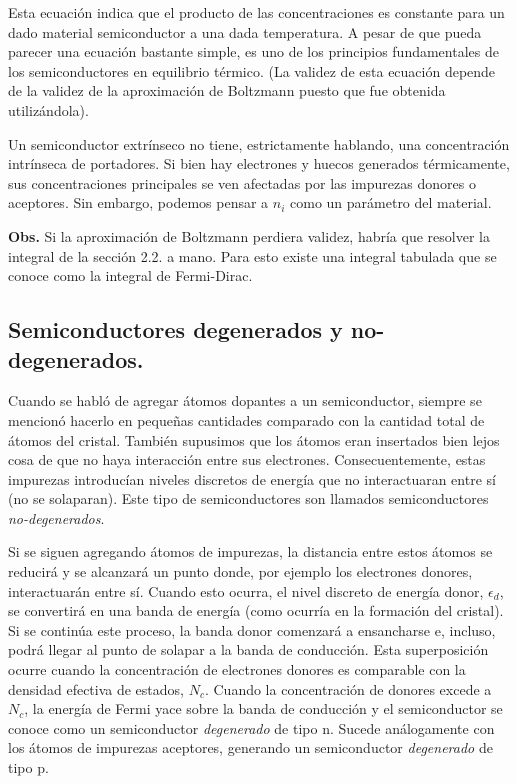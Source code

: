 \documentclass[12pt,a4paper]{article}
\begin{document}
Esta ecuación indica que el producto de las concentraciones es constante para un dado material semiconductor a una dada temperatura. A pesar de que pueda parecer una ecuación bastante simple, es uno de los principios fundamentales de los semiconductores en equilibrio térmico. (La validez de esta ecuación depende de la validez de la aproximación de Boltzmann puesto que fue obtenida utilizándola).

Un semiconductor extrínseco no tiene, estrictamente hablando, una concentración intrínseca de portadores. Si bien hay electrones y huecos generados térmicamente, sus concentraciones principales se ven afectadas por las impurezas donores o aceptores. Sin embargo, podemos pensar a $n_{i}$ como un parámetro del material.

\textbf{Obs.} Si la aproximación de Boltzmann perdiera validez, habría que resolver la integral de la sección 2.2. a mano. Para esto existe una integral tabulada que se conoce como la integral de Fermi-Dirac.

\subsection{Semiconductores degenerados y no-degenerados.}

Cuando se habló de agregar átomos dopantes a un semiconductor, siempre se mencionó hacerlo en pequeñas cantidades comparado con la cantidad total de átomos del cristal. También supusimos que los átomos eran insertados bien lejos cosa de que no haya interacción entre sus electrones. Consecuentemente, estas impurezas introducían niveles discretos de energía que no interactuaran entre sí (no se solaparan). Este tipo de semiconductores son llamados semiconductores \emph{no-degenerados}.

Si se siguen agregando átomos de impurezas, la distancia entre estos átomos se reducirá y se alcanzará un punto donde, por ejemplo los electrones donores, interactuarán entre sí. Cuando esto ocurra, el nivel discreto de energía donor, $\epsilon _{d}$, se convertirá en una banda de energía (como ocurría en la formación del cristal). Si se continúa este proceso, la banda donor comenzará a ensancharse e, incluso, podrá llegar al punto de solapar a la banda de conducción. Esta superposición ocurre cuando la concentración de electrones donores es comparable con la densidad efectiva de estados, $N_{c}$. Cuando la concentración de donores excede a $N_{c}$, la energía de Fermi yace sobre la banda de conducción y el semiconductor se conoce como un semiconductor \emph{degenerado} de tipo n. Sucede análogamente con los átomos de impurezas aceptores, generando un semiconductor \emph{degenerado} de tipo p.
\end{document}

